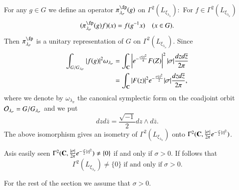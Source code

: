 For any $g \in G$ we define an operator $\pi_{\lambda_{\sigma}}^{\fp}(g)$ on $\Gamma^{2}(L_{\xi_{\lambda_{\sigma}}}):$ For $f \in \Gamma^{2}(L_{\xi_{\lambda_{\sigma}}})$
$$
(\pi_{\lambda_{\sigma}}^{\fp}(g)f)(x)=f(g^{-1}x) \quad (x \in G).
$$
Then $ \pi_{\lambda_{\sigma}}^{\fp}$ is a unitary representation of $G$ on $\Gamma^{2}(L_{\xi_{\lambda_{\sigma}}})$.  Since
\begin{align*}
\int_{G/G_{\lambda_{\sigma}}}|f(g)|^{2}\omega_{\lambda_{\sigma}} &= \int_{\mathbf{C}}\left| e^{-\frac{\sigma|z|^{2}}{4}}F(Z)\right|^{2} |\sigma| \dfrac{dzd\overline{z}}{2\pi}\\
&= \int_{\mathbf{C}}|F(z)|^{2} e^{-\frac{\sigma |z|^{2}}{2}}|\sigma| \dfrac{dzd\overline{z}}{2\pi},
\end{align*}
where we denote by $\omega_{\lambda_{\sigma}}$ the canonical symplectic form on the coadjoint orbit $\mathcal{O}_{\lambda_{\sigma}}= G/G_{\lambda_{\sigma}}$ and we put
$$
dzd\overline{z}= \dfrac{\sqrt{-1}}{2}dz \wedge d\overline{z}.
$$
The above isomorphism gives an isometry of $\Gamma^{2}(L_{\xi_{\lambda_{\sigma}}})$ onto $\Gamma^{2}(\bC, \frac{|\sigma|}{2 \pi}\break e^{-\frac{\sigma}{2}|z|^{2}})$.

As\pageoriginale is easily seen $\Gamma^{2}(\mathbf{C}, \frac{|\sigma|}{2\pi}e^{-\frac{\sigma}{2}|z|^{2}}) \neq \{0\}$ if and only if $\sigma > 0$. If follows that
$$
\Gamma^{2}(L_{\xi_{\lambda_{\sigma}}})\neq \{0\}\; \text{if and only if}\; \sigma > 0.
$$

For the rest of the section we assume that  $\sigma > 0$.

